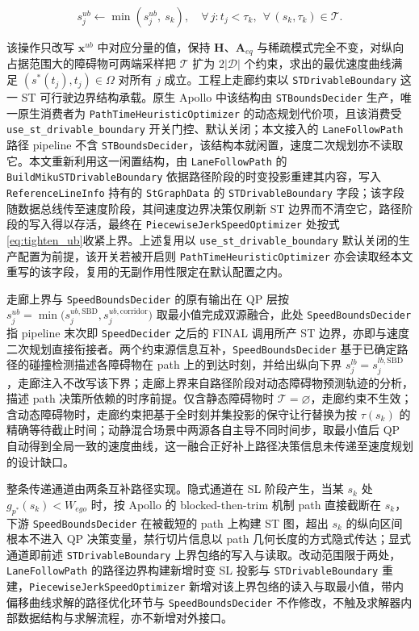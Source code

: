 \documentclass[a4paper,zihao=5]{ctexart}
\theoremstyle{definition}
\begin{document}
\begin{equation}
    s_j^{ub} \leftarrow \min\!\left(s_j^{ub},\ s_k\right), \quad \forall\, j: t_j < \tau_k,\ \ \forall\, (s_k, \tau_k) \in \mathcal{T}.
    \label{eq:tighten_ub}
\end{equation}

该操作只改写 $\mathbf{x}^{ub}$ 中对应分量的值，保持 $\mathbf{H}$、$\mathbf{A}_{eq}$ 与稀疏模式完全不变，对纵向占据范围大的障碍物可两端采样把 $\mathcal{T}$ 扩为 $2|\mathcal{D}|$ 个约束，求出的最优速度曲线满足 $(s^{*}(t_j), t_j) \in \Omega$ 对所有 $j$ 成立。工程上走廊约束以 \texttt{STDrivableBoundary} 这一 ST 可行驶边界结构承载。原生 Apollo 中该结构由 \texttt{STBoundsDecider} 生产，唯一原生消费者为 \texttt{PathTimeHeuristicOptimizer} 的动态规划代价项，且该消费受 \texttt{use\_st\_drivable\_boundary} 开关门控、默认关闭；本文接入的 \texttt{LaneFollowPath} 路径 pipeline 不含 \texttt{STBoundsDecider}，该结构本就闲置，速度二次规划亦不读取它。本文重新利用这一闲置结构，由 \texttt{LaneFollowPath} 的 \texttt{BuildMikuSTDrivableBoundary} 依据路径阶段的时变投影重建其内容，写入 \texttt{ReferenceLineInfo} 持有的 \texttt{StGraphData} 的 \texttt{STDrivableBoundary} 字段；该字段随数据总线传至速度阶段，其间速度边界决策仅刷新 ST 边界而不清空它，路径阶段的写入得以存活，最终在 \texttt{PiecewiseJerkSpeedOptimizer} 处按式\eqref{eq:tighten_ub}收紧上界。上述复用以 \texttt{use\_st\_drivable\_boundary} 默认关闭的生产配置为前提，该开关若被开启则 \texttt{PathTimeHeuristicOptimizer} 亦会读取经本文重写的该字段，复用的无副作用性限定在默认配置之内。

走廊上界与 \texttt{SpeedBoundsDecider} 的原有输出在 QP 层按 $s_j^{ub} = \min\big(s_j^{ub,\mathrm{SBD}}, s_j^{ub,\mathrm{corridor}}\big)$ 取最小值完成双源融合，此处 \texttt{SpeedBoundsDecider} 指 pipeline 末次即 \texttt{SpeedDecider} 之后的 FINAL 调用所产 ST 边界，亦即与速度二次规划直接衔接者。两个约束源信息互补，\texttt{SpeedBoundsDecider} 基于已确定路径的碰撞检测描述各障碍物在 path 上的到达时刻，并给出纵向下界 $s_j^{lb}=s_j^{lb,\mathrm{SBD}}$，走廊注入不改写该下界；走廊上界来自路径阶段对动态障碍物预测轨迹的分析，描述 path 决策所依赖的时序前提。仅含静态障碍物时 $\mathcal{T}=\varnothing$，走廊约束不生效；含动态障碍物时，走廊约束把基于全时刻并集投影的保守让行替换为按 $\tau(s_k)$ 的精确等待截止时间；动静混合场景中两源各自主导不同时间步，取最小值后 QP 自动得到全局一致的速度曲线，这一融合正好补上路径决策信息未传递至速度规划的设计缺口。

整条传递通道由两条互补路径实现。隐式通道在 SL 阶段产生，当某 $s_k$ 处 $g_{p^{*}}(s_k)<W_{ego}$ 时，按 Apollo 的 blocked-then-trim 机制 path 直接截断在 $s_k$，下游 \texttt{SpeedBoundsDecider} 在被截短的 path 上构建 ST 图，超出 $s_k$ 的纵向区间根本不进入 QP 决策变量，禁行切片信息以 path 几何长度的方式隐式传达；显式通道即前述 \texttt{STDrivableBoundary} 上界包络的写入与读取。改动范围限于两处，\texttt{LaneFollowPath} 的路径边界构建新增时变 SL 投影与 \texttt{STDrivableBoundary} 重建，\texttt{PiecewiseJerkSpeedOptimizer} 新增对该上界包络的读入与取最小值，带内偏移曲线求解的路径优化环节与 \texttt{SpeedBoundsDecider} 不作修改，不触及求解器内部数据结构与求解流程，亦不新增对外接口。
\end{document}
